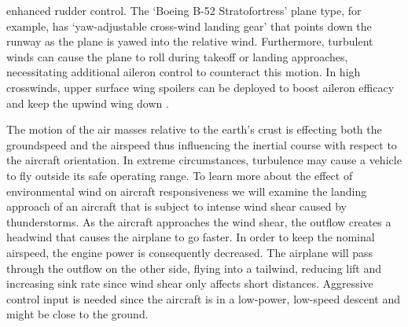 \documentclass[twocolumn,showpacs,
    nofootinbib,aps,superscriptaddress,
    eqsecnum,prd,showkeys,10pt,floatfix]{revtex4}
\begin{document}
enhanced rudder control. The `Boeing B-52 Stratofortress' plane type, for
example, has `yaw-adjustable cross-wind landing gear' that points down the
runway as the plane is yawed into the relative wind. Furthermore, turbulent
winds can cause the plane to roll during takeoff or landing approaches,
necessitating additional aileron control to counteract this motion. In high
crosswinds, upper surface wing spoilers can be deployed to boost aileron
efficacy and keep the upwind wing down {\cite{51}}.
\par
The motion of the air masses relative to the earth's crust is effecting both the groundspeed and the airspeed
thus influencing the inertial course with respect to the aircraft orientation. In
extreme circumstances, turbulence may cause a vehicle to fly outside its safe
operating range. To learn more about the effect of environmental wind on
aircraft responsiveness we will examine the landing approach of an aircraft
that is subject to intense wind shear caused by thunderstorms. As the aircraft
approaches the wind shear, the outflow creates a headwind that causes the
airplane to go faster. In order to keep the nominal airspeed, the engine power
is consequently decreased. The airplane will pass through the outflow on the
other side, flying into a tailwind, reducing lift and increasing sink rate
since wind shear only affects short distances. Aggressive control input is
needed since the aircraft is in a low-power, low-speed descent and might be
close to the ground.

\end{document}
